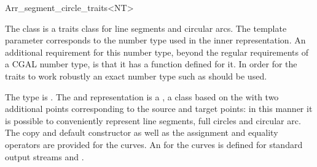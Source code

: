 
\ccRefPageBegin

\begin{ccRefClass}{Arr_segment_circle_traits<NT>}

\ccDefinition
    The class  is a traits class
    for line segments and circular arcs. The template parameter 
    corresponds to the number type used in the inner representation.
    An additional requirement for this number type, beyond the regular
    requirements of a CGAL number type, is that it has a 
    function defined for it. In order for the traits to work robustly
    an exact number type such as  should be used.

    The  type is . The  
     and 
    representation is a , a class
    based on the 
    with two additional points corresponding to the source and target points:
    in this manner it is possible to conveniently represent line segments,
    full circles and circular arc.
    The copy and default constructor as well as the
    assignment and equality operators are provided for the curves. 
    An  for the curves is defined for
    standard output streams and .



\ccIsModel
     

\end{ccRefClass} %

\ccRefPageEnd
